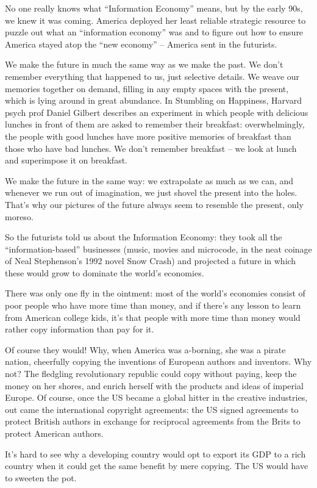 No one really knows what ``Information Economy'' means, but by the
early 90s, we knew it was coming. America deployed her least
reliable strategic resource to puzzle out what an ``information
economy'' was and to figure out how to ensure America stayed atop
the ``new economy'' -- America sent in the futurists.

We make the future in much the same way as we make the past. We
don't remember everything that happened to us, just selective
details. We weave our memories together on demand, filling in any
empty spaces with the present, which is lying around in great
abundance. In Stumbling on Happiness, Harvard psych prof Daniel
Gilbert describes an experiment in which people with delicious
lunches in front of them are asked to remember their breakfast:
overwhelmingly, the people with good lunches have more positive
memories of breakfast than those who have bad lunches. We don't
remember breakfast -- we look at lunch and superimpose it on
breakfast.

We make the future in the same way: we extrapolate as much as we
can, and whenever we run out of imagination, we just shovel the
present into the holes. That's why our pictures of the future
always seem to resemble the present, only moreso.

So the futurists told us about the Information Economy: they took
all the ``information-based'' businesses (music, movies and
microcode, in the neat coinage of Neal Stephenson's 1992 novel Snow
Crash) and projected a future in which these would grow to dominate
the world's economies.

There was only one fly in the ointment: most of the world's
economies consist of poor people who have more time than money, and
if there's any lesson to learn from American college kids, it's
that people with more time than money would rather copy information
than pay for it.

Of course they would! Why, when America was a-borning, she was a
pirate nation, cheerfully copying the inventions of European
authors and inventors. Why not? The fledgling revolutionary
republic could copy without paying, keep the money on her shores,
and enrich herself with the products and ideas of imperial Europe.
Of course, once the US became a global hitter in the creative
industries, out came the international copyright agreements: the US
signed agreements to protect British authors in exchange for
reciprocal agreements from the Brits to protect American authors.

It's hard to see why a developing country would opt to export its
GDP to a rich country when it could get the same benefit by mere
copying. The US would have to sweeten the pot.

